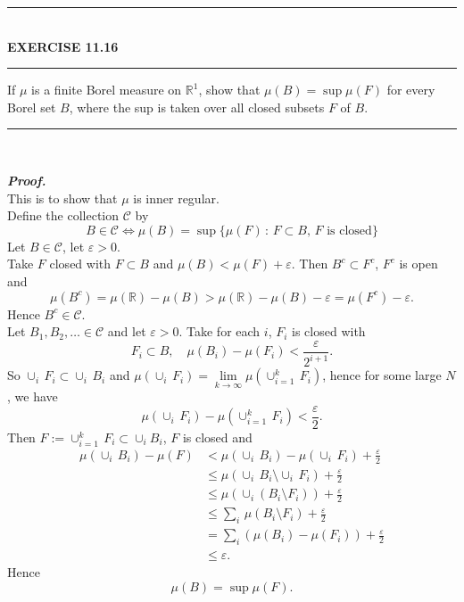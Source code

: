 \documentclass[a4paper,11pt]{article}
\begin{document}
	\begin{flushleft}
		\rule[-0.5ex]{17cm}{2pt}\\
			\textbf{EXERCISE 11.16}\\
		\rule[1.5ex]{17cm}{0.5pt}
			If $\mu$ is a finite Borel measure on $\mathbb{R}^1$, show that $\mu(B) = \sup \mu(F)$ for every Borel set $B$, where the sup is taken over all closed subsets $F$ of $B$.
		\rule[1.0ex]{17cm}{0.5pt}\
	\end{flushleft}
	\textbf{\textit{Proof.}}\\
	This is to show that $\mu$ is inner regular.\\
	Define the collection $\mathscr{C}$ by
		$$B \in \mathscr{C}
		\iff \mu(B) = \sup \{\mu(F)\,:\,F \subset B,\,F \text{ is closed}\}
		$$
	Let $B \in \mathscr{C}$, let $\varepsilon > 0$.\\
	Take $F$ closed with $F \subset B$ and $\mu(B) < \mu(F) + \varepsilon$. Then $B^c \subset F^c$, $F^c$ is open and
		$$\mu(B^c) = \mu(\mathbb{R}) - \mu(B) > \mu(\mathbb{R}) - \mu(B) - \varepsilon = \mu(F^c) - \varepsilon.$$
	Hence $B^c \in \mathscr{C}$.\\
	Let $B_1, B_2, \dots \in \mathscr{C}$ and let $\varepsilon > 0$. Take for each $i$, $F_i$ is closed with
		$$F_i \subset B, \quad \mu(B_i) - \mu(F_i) < \frac{\varepsilon}{2^{i+1}}.$$
	So $\cup_i\,F_i \subset \cup_i\,B_i$ and $\mu(\cup_i\,F_i) = \underset{k \to \infty}{\lim}\mu(\cup_{i=1}^k\,F_i)$, hence for some large $N$, we have
		$$\mu(\cup_i\,F_i) - \mu(\cup_{i=1}^k\,F_i) < \frac{\varepsilon}{2}.$$
	Then $F := \cup_{i=1}^k\,F_i \subset \cup_i B_i$, $F$ is closed and
		$$\begin{aligned}
		\mu(\cup_i\,B_i) - \mu(F)
		&< \mu(\cup_i\,B_i) - \mu(\cup_i\,F_i) + \frac{\varepsilon}{2}\\
		&\leq \mu(\cup_i\,B_i \setminus \cup_i\,F_i) + \frac{\varepsilon}{2}\\
		&\leq \mu(\cup_i(B_i \setminus F_i)) + \frac{\varepsilon}{2}\\
		&\leq \sum_i\,\mu(B_i \setminus F_i) + \frac{\varepsilon}{2}\\
		&= \sum_i \left(\mu(B_i) - \mu(F_i)\right) + \frac{\varepsilon}{2}\\
		&\leq \varepsilon.
		\end{aligned}$$
	Hence
		$$\mu(B) = \sup \mu(F).$$


\end{document}
